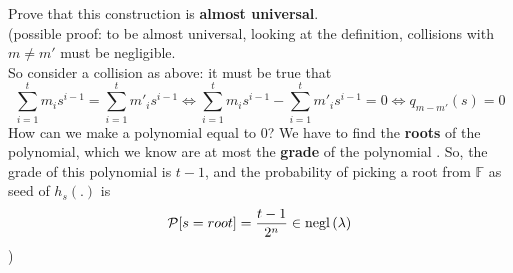 \begin{exercise}
    Prove that this construction is \textbf{almost universal}.\\
    (possible proof: to be almost universal, looking at the definition,
    collisions with $m \not= m'$ must be negligible.\\
    So consider a collision as above: it must be true that  
    \[
     \sum_{i=1}^{t} m_{i}s^{i-1}=\sum_{i=1}^{t} m'_{i}s^{i-1} \Leftrightarrow 
     \sum_{i=1}^{t} m_{i}s^{i-1}-\sum_{i=1}^{t} m'_{i}s^{i-1}=0 \Leftrightarrow
     q_{m-m'}(s)=0
    \]
    How can we make a polynomial equal to 0? We have to find the \textbf{roots}
    of the polynomial, which we know are at most the \textbf{grade} of the polynomial . 
    So, the grade of this polynomial is $t-1$, and the probability of picking a
    root from $ \mathbb{F} $ as seed of $h_{s}(.)$ is 
    \[
        \mathcal{P} [s=root]=\frac{t-1}{2^{n}}   \in \mathrm{negl}\left({\lambda}\right) 
    \] )
\end{exercise}
 
